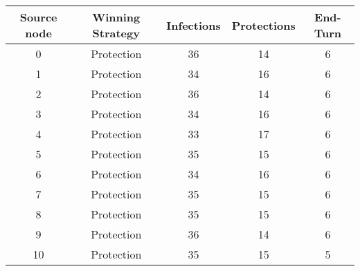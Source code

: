 \documentclass[results.tex]{subfiles}
\begin{document}
    \begin{center}
        \begin{tabular}{| c || c | c | c | c |}
            \hline
            {\bfseries Source node} & {\bfseries Winning Strategy} & {\bfseries Infections} & {\bfseries Protections}
            & {\bfseries End-Turn}
            \\  %
            \hline\hline
            0                       & Protection                   & 36                     & 14                      & 6                    \\
            \hline
            1                       & Protection                   & 34                     & 16                      & 6                    \\
            \hline
            2                       & Protection                   & 36                     & 14                      & 6                    \\
            \hline
            3                       & Protection                   & 34                     & 16                      & 6                    \\
            \hline
            4                       & Protection                   & 33                     & 17                      & 6                    \\
            \hline
            5                       & Protection                   & 35                     & 15                      & 6                    \\
            \hline
            6                       & Protection                   & 34                     & 16                      & 6                    \\
            \hline
            7                       & Protection                   & 35                     & 15                      & 6                    \\
            \hline
            8                       & Protection                   & 35                     & 15                      & 6                    \\
            \hline
            9                       & Protection                   & 36                     & 14                      & 6                    \\
            \hline
            10                      & Protection                   & 35                     & 15                      & 5                    \\

\end{tabular}
\end{center}
\end{document}
